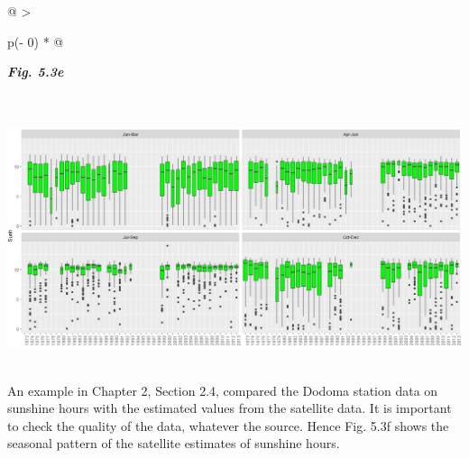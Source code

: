 \documentclass[
  letterpaper,
  DIV=11,
  numbers=noendperiod]{scrreprt}
\begin{document}
\begin{longtable}[]{@{}
  >{\raggedright\arraybackslash}p{(\columnwidth - 0\tabcolsep) * }@{}}
\toprule\noalign{}
\begin{minipage}[b]{\linewidth}\raggedright
\textbf{\emph{Fig. 5.3e}}
\end{minipage} \\
\midrule\noalign{}
\endhead
\bottomrule\noalign{}
\endlastfoot
\includegraphics[width=6.05625in,height=2.93285in]{figures/Fig5.3e.png} \\
\end{longtable}

An example in Chapter 2, Section 2.4, compared the Dodoma station data
on sunshine hours with the estimated values from the satellite data. It
is important to check the quality of the data, whatever the source.
Hence Fig. 5.3f shows the seasonal pattern of the satellite estimates of
sunshine hours.
\end{document}
